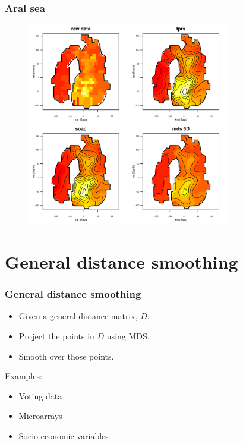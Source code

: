 \documentclass[ignorenonframetext]{beamer} %
\newcommand{\bi}{\begin{itemize}}
\newcommand{\ei}{\end{itemize}}
\begin{document}
\begin{frame}
	\frametitle{Aral sea}
   \begin{figure}
      \includegraphics[height=3.5in]{figs/aral-duchon-comp.pdf}
   \end{figure}
\end{frame}




\section{General distance smoothing}

\begin{frame}
	\frametitle{General distance smoothing}
	\bi
		\item Given a general distance matrix, $D$.
		\item Project the points in $D$ using MDS.
		\item Smooth over those points.
	\ei
	\centering Examples:
	\bi
		\item Voting data
		\item Microarrays
		\item Socio-economic variables
	\ei	
\end{frame}



\end{document}
